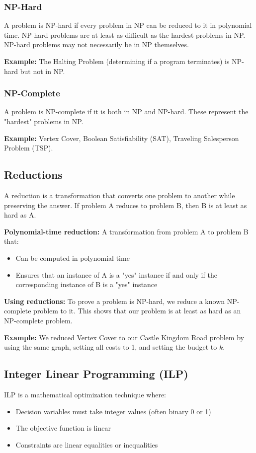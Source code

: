 \subsubsection{NP-Hard}
A problem is NP-hard if every problem in NP can be reduced to it in polynomial time. NP-hard problems are at least as difficult as the hardest problems in NP. NP-hard problems may not necessarily be in NP themselves.

\textbf{Example:} The Halting Problem (determining if a program terminates) is NP-hard but not in NP.

\subsubsection{NP-Complete}
A problem is NP-complete if it is both in NP and NP-hard. These represent the "hardest" problems in NP.

\textbf{Example:} Vertex Cover, Boolean Satisfiability (SAT), Traveling Salesperson Problem (TSP).

\subsection{Reductions}
A reduction is a transformation that converts one problem to another while preserving the answer. If problem A reduces to problem B, then B is at least as hard as A.

\textbf{Polynomial-time reduction:} A transformation from problem A to problem B that:
\begin{itemize}
    \item Can be computed in polynomial time
    \item Ensures that an instance of A is a "yes" instance if and only if the corresponding instance of B is a "yes" instance
\end{itemize}

\textbf{Using reductions:} To prove a problem is NP-hard, we reduce a known NP-complete problem to it. This shows that our problem is at least as hard as an NP-complete problem.

\textbf{Example:} We reduced Vertex Cover to our Castle Kingdom Road problem by using the same graph, setting all costs to 1, and setting the budget to $k$.

\subsection{Integer Linear Programming (ILP)}
ILP is a mathematical optimization technique where:
\begin{itemize}
    \item Decision variables must take integer values (often binary 0 or 1)
    \item The objective function is linear
    \item Constraints are linear equalities or inequalities
\end{itemize}

